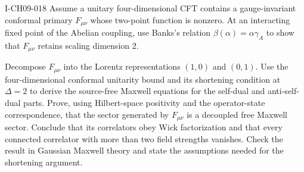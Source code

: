 \begin{exercise}{I-CH09-018}
Assume a unitary four-dimensional CFT contains a gauge-invariant conformal
primary $F_{\mu\nu}$ whose two-point function is nonzero.  At an interacting
fixed point of the Abelian coupling, use Banks's relation
$\beta(\alpha)=\alpha\gamma_A$ to show that $F_{\mu\nu}$ retains scaling
dimension $2$.

Decompose $F_{\mu\nu}$ into the Lorentz representations $(1,0)$ and $(0,1)$.
Use the four-dimensional conformal unitarity bound and its shortening
condition at $\Delta=2$ to derive the source-free Maxwell equations for the
self-dual and anti-self-dual parts.  Prove, using Hilbert-space positivity and
the operator-state correspondence, that the sector generated by
$F_{\mu\nu}$ is a decoupled free Maxwell sector.  Conclude that its correlators
obey Wick factorization and that every connected correlator with more than two
field strengths vanishes.  Check the result in Gaussian Maxwell theory and
state the assumptions needed for the shortening argument.
\end{exercise}

